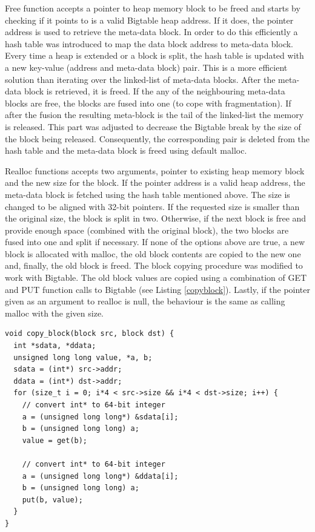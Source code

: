 \documentclass[bsc,frontabs,twoside,singlespacing,parskip,deptreport]{infthesis}     %
\begin{document}
Free function accepts a pointer to heap memory block to be freed and starts by checking if it points to is a valid Bigtable heap address. If it does, the pointer address is used to retrieve the meta-data block. In order to do this efficiently a hash table was introduced to map the data block address to meta-data block. Every time a heap is extended or a block is split, the hash table is updated with a new key-value (address and meta-data block) pair. This is a more efficient solution than iterating over the linked-list of meta-data blocks. After the meta-data block is retrieved, it is freed. If the any of the neighbouring meta-data blocks are free, the blocks are fused into one (to cope with fragmentation). If after the fusion the resulting meta-block is the tail of the linked-list the memory is released. This part was adjusted to decrease the Bigtable break by the size of the block being released. Consequently, the corresponding pair is deleted from the hash table and the meta-data block is freed using default malloc.

Realloc functions accepts two arguments, pointer to existing heap memory block and the new size for the block. If the pointer address is a valid heap address, the meta-data block is fetched using the hash table mentioned above. The size is changed to be aligned with 32-bit pointers. If the requested size is smaller than the original size, the block is split in two. Otherwise, if the next block is free and provide enough space (combined with the original block), the two blocks are fused into one and split if necessary. If none of the options above are true, a new block is allocated with malloc, the old block contents are copied to the new one and, finally, the old block is freed. The block copying procedure was modified to work with Bigtable. The old block values are copied using a combination of GET and PUT function calls to Bigtable (see Listing \ref{copyblock}). Lastly, if the pointer given as an argument to realloc is null, the behaviour is the same as calling malloc with the given size.

\begin{lstlisting}[caption=copy\_block implementation, label=copyblock, style=block]
void copy_block(block src, block dst) {
  int *sdata, *ddata;
  unsigned long long value, *a, b;
  sdata = (int*) src->addr;
  ddata = (int*) dst->addr;
  for (size_t i = 0; i*4 < src->size && i*4 < dst->size; i++) {
    // convert int* to 64-bit integer
    a = (unsigned long long*) &sdata[i];
    b = (unsigned long long) a;  
    value = get(b);
    
    // convert int* to 64-bit integer
    a = (unsigned long long*) &ddata[i];
    b = (unsigned long long) a;
    put(b, value);
  }
}
\end{lstlisting}
\end{document}

